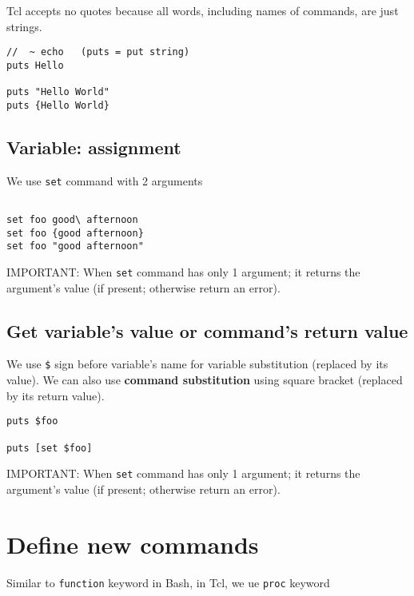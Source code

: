 Tcl accepts no quotes because all words, including names of commands, are just
strings.

\begin{verbatim}
//  ~ echo   (puts = put string)
puts Hello

puts "Hello World"
puts {Hello World}

\end{verbatim}

\subsection{Variable: assignment}
\label{sec:tcl-assignment}

We use \verb!set! command with 2 arguments

\begin{verbatim}

set foo good\ afternoon
set foo {good afternoon}
set foo "good afternoon"
\end{verbatim}

IMPORTANT: When \verb!set! command has only 1 argument; it returns the
argument's value (if present; otherwise return an error). 

\subsection{Get variable's value or command's return value}

We use \verb!$! sign before variable's name for variable substitution
(replaced by its value). We can also use {\bf command substitution} using square
bracket (replaced by its return value).

\begin{verbatim}
puts $foo

puts [set $foo]
\end{verbatim}

IMPORTANT: When \verb!set! command has only 1 argument; it returns the
argument's value (if present; otherwise return an error). 


\section{Define new commands}
\label{sec:tcl-define-new-commands}

Similar to \verb!function! keyword in Bash, in Tcl, we ue \verb!proc! keyword

